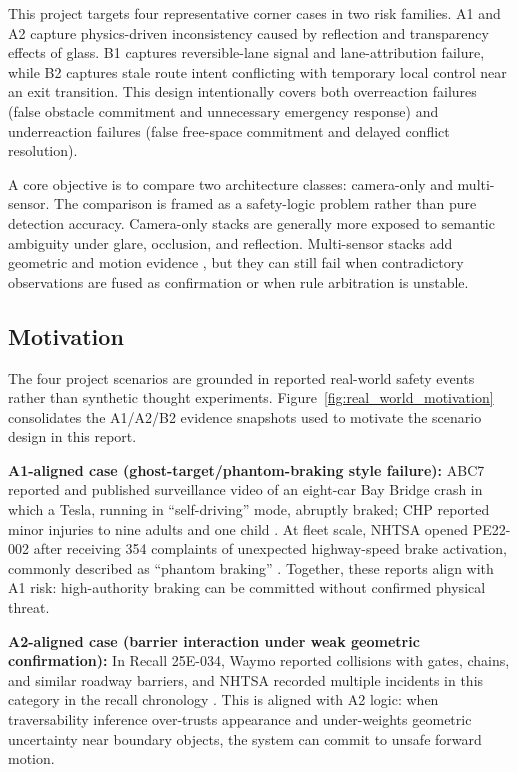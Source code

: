 \documentclass[sigconf,nonacm]{acmart}
\begin{document}
This project targets four representative corner cases in two risk families. A1 and A2 capture physics-driven inconsistency caused by reflection and transparency effects of glass. B1 captures reversible-lane signal and lane-attribution failure, while B2 captures stale route intent conflicting with temporary local control near an exit transition. This design intentionally covers both overreaction failures (false obstacle commitment and unnecessary emergency response) and underreaction failures (false free-space commitment and delayed conflict resolution).

A core objective is to compare two architecture classes: camera-only and multi-sensor. The comparison is framed as a safety-logic problem rather than pure detection accuracy. Camera-only stacks are generally more exposed to semantic ambiguity under glare, occlusion, and reflection. Multi-sensor stacks add geometric and motion evidence \cite{huang2022survey}, but they can still fail when contradictory observations are fused as confirmation or when rule arbitration is unstable.

\subsection{Motivation}
The four project scenarios are grounded in reported real-world safety events rather than synthetic thought experiments.
Figure~\ref{fig:real_world_motivation} consolidates the A1/A2/B2 evidence snapshots used to motivate the scenario design in this report.

\textbf{A1-aligned case (ghost-target/phantom-braking style failure):} ABC7 reported and published surveillance video of an eight-car Bay Bridge crash in which a Tesla, running in ``self-driving'' mode, abruptly braked; CHP reported minor injuries to nine adults and one child \cite{abc7baybridge2023}. At fleet scale, NHTSA opened PE22-002 after receiving 354 complaints of unexpected highway-speed brake activation, commonly described as ``phantom braking'' \cite{nhtsape22002}. Together, these reports align with A1 risk: high-authority braking can be committed without confirmed physical threat.

\textbf{A2-aligned case (barrier interaction under weak geometric confirmation):} In Recall 25E-034, Waymo reported collisions with gates, chains, and similar roadway barriers, and NHTSA recorded multiple incidents in this category in the recall chronology \cite{waymo2025recall}. This is aligned with A2 logic: when traversability inference over-trusts appearance and under-weights geometric uncertainty near boundary objects, the system can commit to unsafe forward motion.
\end{document}
